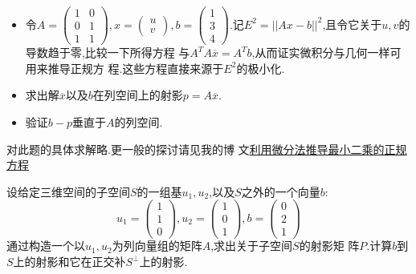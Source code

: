 ﻿\documentclass{book} \usepackage{exsheets} \usepackage{xeCJK}
\begin{document}
\begin{question}
  \begin{itemize}
  \item 令$A=
    \begin{pmatrix}
      1&0\\
      0&1\\
      1&1
    \end{pmatrix},x=
    \begin{pmatrix}
      u\\
      v
    \end{pmatrix}, b=
    \begin{pmatrix}
      1\\
      3\\
      4
    \end{pmatrix}
    $.记$E^2=||Ax-b||^2$,且令它关于$u,v$的导数趋于零,比较一下所得方程
    与$A^TA\overline{x}=A^Tb$,从而证实微积分与几何一样可用来推导正规方
    程.这些方程直接来源于$E^2$的极小化.
  \item 求出解$\overline{x}$以及$b$在列空间上的射影$p=A\overline{x}$.
  \item 验证$b-p$垂直于$A$的列空间.
  \end{itemize}
\end{question}
\begin{solution}
  对此题的具体求解略.更一般的探讨请见我的博
  文\href{http://blogmath.org/2017/12/04/利用微分法推导最小二乘的正规方
    程}{利用微分法推导最小二乘的正规方程}
\end{solution}
\begin{question}
  设给定三维空间的子空间$S$的一组基$u_1,u_2$,以及$S$之外的一个向量$b$:
$$
u_1=
\begin{pmatrix}
  1\\
  1\\
  0
\end{pmatrix},u_2=
\begin{pmatrix}
  1\\
  0\\
  1
\end{pmatrix},b=
\begin{pmatrix}
  0\\
  2\\
  1
\end{pmatrix}
$$
通过构造一个以$u_1,u_2$为列向量组的矩阵$A$,求出关于子空间$S$的射影矩
阵$P$.计算$b$到$S$上的射影和它在正交补$S^{\perp}$上的射影.
\end{question}
\end{document}
